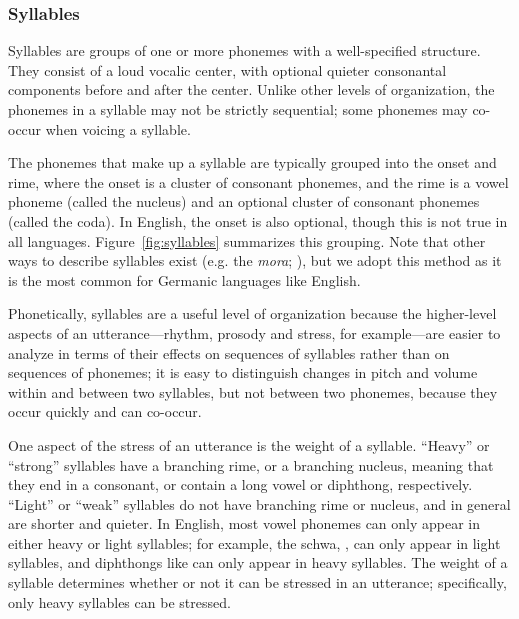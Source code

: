 

\subsubsection{Syllables}

Syllables are groups of one or more phonemes
with a well-specified structure.
They consist of a loud vocalic center,
with optional quieter consonantal components
before and after the center.
Unlike other levels of organization,
the phonemes in a syllable
may not be strictly sequential;
some phonemes may co-occur
when voicing a syllable.

The phonemes that make up a syllable
are typically grouped into
the onset and rime,
where the onset is a cluster of
consonant phonemes,
and the rime is a vowel phoneme
(called the nucleus)
and an optional cluster of consonant
phonemes (called the coda).
In English, the onset is also optional,
though this is not true in all languages.
Figure~\ref{fig:syllables} summarizes this grouping.
Note that other ways to describe
syllables exist
(e.g. the \textit{mora}; \citealt{otake1993}),
but we adopt this method
as it is the most common
for Germanic languages like English.


Phonetically, syllables are a useful
level of organization because
the higher-level aspects
of an utterance---rhythm, prosody and stress,
for example---are easier to analyze
in terms of their effects on
sequences of syllables rather than
on sequences of phonemes;
it is easy to distinguish
changes in pitch and volume
within and between two syllables,
but not between two phonemes,
because they occur quickly
and can co-occur.

One aspect of the stress of an utterance
is the weight of a syllable.
``Heavy'' or ``strong'' syllables
have a branching rime,
or a branching nucleus,
meaning that they
end in a consonant,
or contain a long vowel or diphthong,
respectively.
``Light'' or ``weak'' syllables
do not have branching rime or nucleus,
and in general are shorter
and quieter.
In English, most vowel phonemes
can only appear in either
heavy or light syllables;
for example, the schwa, \ipa{[@]},
can only appear in light syllables,
and diphthongs like \ipa{[aU]}
can only appear in heavy syllables.
The weight of a syllable determines
whether or not it can be stressed
in an utterance;
specifically, only heavy syllables
can be stressed.

